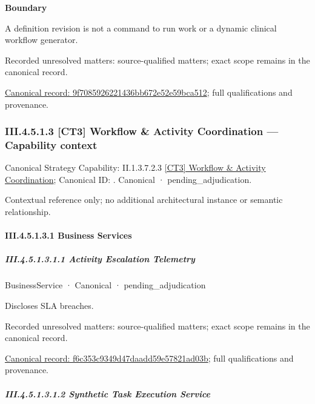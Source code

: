 \textbf{Boundary}



A definition revision is not a command to run work or a dynamic clinical workflow generator.


{\small Recorded unresolved matters: source-qualified matters; exact scope remains in the canonical record.}\par
{\footnotesize \href{../../../../continuum/business/business-function/9f7085926221436bb672e52e59bca512.md}{Canonical record: 9f7085926221436bb672e52e59bca512}; full qualifications and provenance.}\par
\subsubsection*{III.4.5.1.3 [CT3] Workflow \& Activity Coordination — Capability context}
\label{navigation:III.4.5.1.3}

{\small Canonical Strategy Capability: II.1.3.7.2.3 \hyperref[element:94c683c7588f475e973b58cb226345db]{[CT3] Workflow \& Activity Coordination}; Canonical ID: \texttt{}. Canonical · pending\_adjudication.}\par
Contextual reference only; no additional architectural instance or semantic relationship.\par
\paragraph*{III.4.5.1.3.1 Business Services}
\label{navigation:III.4.5.1.3.1}

\subparagraph*{III.4.5.1.3.1.1 Activity Escalation Telemetry}
\label{navigation:III.4.5.1.3.1.1}

\label{element:f6c353c9349d47daadd59e57821ad03b}
{\small BusinessService · Canonical · pending\_adjudication}\par

Discloses SLA breaches.


{\small Recorded unresolved matters: source-qualified matters; exact scope remains in the canonical record.}\par
{\footnotesize \href{../../../../continuum/business/business-service/f6c353c9349d47daadd59e57821ad03b.md}{Canonical record: f6c353c9349d47daadd59e57821ad03b}; full qualifications and provenance.}\par
\subparagraph*{III.4.5.1.3.1.2 Synthetic Task Execution Service}
\label{navigation:III.4.5.1.3.1.2}

